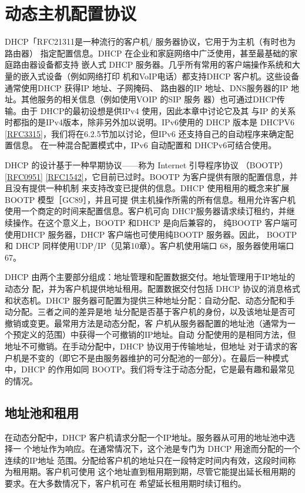 \section{动态主机配置协议}
DHCP「RFC21311是一种流行的客户机/ 服务器协议，它用于为主机（有时也为路由器）
指定配置信息。DHCP 在企业和家庭网络中广泛使用，甚至最基础的家庭路由器设备都支持
嵌人式 DHCP 服务器。几乎所有常用的客户端操作系统和大量的嵌入式设备（例如网络打印
机和VoIP电话）都支持DHCP 客户机。这些设备通常使用DHCP 获得IP 地址、子网掩码、
路由器的IP 地址、DNS服务器的IP 地址。其他服务的相关信息（例如使用VOIP 的SIP 服务
器）也可通过DHCP传输。由于 DHCP的最初设想是供IPv4 使用，因此本章中讨论它及其
与IP 的关系时都指的是IPv4版本，除非另外加以说明。IPv6使用的 DHCP 版本是 DHCPV6
\href{https://www.rfc-editor.org/rfc/rfc3315}{\href{https://www.rfc-editor.org/rfc/rfc3315}{[RFC3315]}}，我们将在6.2.5节加以讨论，但IPv6
还支持自己的自动程序来确定配置信息。
在一种混合配置模式中，IPv6 自动配置和 DHCPv6可结合使用。

DHCP 的设计基于一种早期协议——称为 Internet 引导程序协议
（BOOTP）\href{https://www.rfc-editor.org/rfc/rfc0951}{\href{https://www.rfc-editor.org/rfc/rfc0951}{[RFC0951]}}
\href{https://www.rfc-editor.org/rfc/rfc1542}{\href{https://www.rfc-editor.org/rfc/rfc1542}{[RFC1542]}}，它目前已过时。BOOTP
为客户提供有限的配置信息，并且没有提供一种机制
来支持改变已提供的信息。DHCP 使用租用的概念来扩展BOOTP 模型［GC89］，并且可提
供主机操作所需的所有信息。租用允许客户机使用一个商定的时间来配置信息。客户机可向
DHCP服务器请求续订租约，并继续操作。在这个意义上，BOOTP 和DHCP 是向后兼容的，
纯BOOTP 客户端可使用DHCP 服务器，DHCP 客户端也可使用纯BOOTP 服务器。因此，
BOOTP 和 DHCP 同样使用UDP/IP（见第10章）。客户机使用端口 68，服务器使用端口 67。

DHCP 由两个主要部分组成：地址管理和配置数据交付。地址管理用于IP地址的动态分
配，并为客户机提供地址租用。配置数据交付包括 DHCP 协议的消息格式和状态机。DHCP
服务器可配置为提供三种地址分配：自动分配、动态分配和手动分配。三者之间的差异是地
址分配是否基于客户机的身份，以及该地址是否可撤销或变更。最常用方法是动态分配，客
户机从服务器配置的地址池（通常为一个预定义的范围）中获得一个可撤销的IP地址。自动
分配使用的是相同方法，但地址不可撤销。在手动分配中，DHCP 协议用于传输地址，但地址
对于请求的客户机是不变的（即它不是由服务器维护的可分配池的一部分）。在最后一种模式
中，DHCP 的作用如同 BOOTP。我们将专注于动态分配，它是最有趣和最常见的情况。

\subsection{地址池和租用}
在动态分配中，DHCP 客户机请求分配一个IP地址。服务器从可用的地址池中选择一
个地址作为响应。在通常情况下，这个池是专门为 DHCP 用途而分配的一个连续的IP地址
范围。分配给客户机的地址只在一段特定时间内有效，这段时间称为租用期。客户机可使用
这个地址直到租用期到期，尽管它能提出延长租用期的要求。在大多数情况下，客户机可在
希望延长租用期时续订租约。

